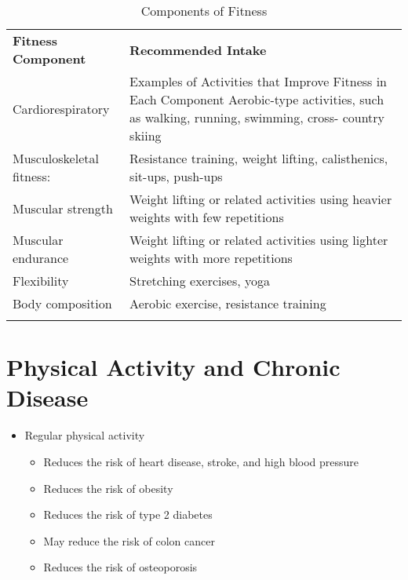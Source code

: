 \documentclass[title={Chapter 11}]{fdsn201notes}
\begin{document}
\begin{table}[H]
	\centering
	\begin{threeparttable}
		\caption{Components of Fitness}
		\label{tab:components-of-fitness}
		\begin{tabular}{p{} p{}}
			\rowcolor{rowdarkgreen}\textbf{Fitness Component} & \textbf{Recommended Intake}\\
			Cardiorespiratory & Examples of Activities that Improve Fitness in Each Component Aerobic-type activities, such as walking, running, swimming, cross- country skiing\\
			Musculoskeletal fitness: & Resistance training, weight lifting, calisthenics, sit-ups, push-ups\\
			\rowcolor{rowmedgreen}Muscular strength & Weight lifting or related activities using heavier weights with few repetitions\\
			\rowcolor{rowmedgreen}Muscular endurance & Weight lifting or related activities using lighter weights with more repetitions\\
			Flexibility & Stretching exercises, yoga\\
			Body composition & Aerobic exercise, resistance training\\
			\rowcolor{rowdarkgreen} & \\
		\end{tabular}
		\begin{tablenotes}
			\small
			\item
		\end{tablenotes}
	\end{threeparttable}
\end{table}

\section{Physical Activity and Chronic Disease}\label{sec:physical-activity-and-chronic-disease}
\begin{itemize}
	\item Regular physical activity
	\begin{itemize}
		\item Reduces the risk of heart disease, stroke, and high blood pressure
		\item Reduces the risk of obesity
		\item Reduces the risk of type 2 diabetes
		\item May reduce the risk of colon cancer
		\item Reduces the risk of osteoporosis
	\end{itemize}
\end{itemize}
\end{document}
